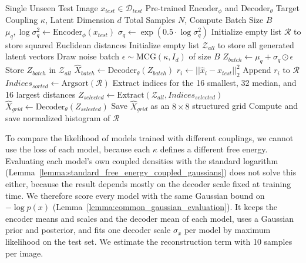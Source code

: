 \documentclass[twoside,11pt]{article}
\begin{document}
\begin{algorithm}[H]
\caption{CVAE Stochastic Consistency Analysis (Deep Tail Exploration)}
\label{alg:cvae_stochastic}
\begin{algorithmic}[1]
\Require Single Unseen Test Image $x_{test} \in \mathcal{D}_{test}$
\Require Pre-trained $\text{Encoder}_\phi$ and $\text{Decoder}_\theta$
\Require Target Coupling $\kappa$, Latent Dimension $d$
\Require Total Samples $N$, Compute Batch Size $B$
\Statex
\State {}
\State $\mu_q, \log\sigma_q^2 \leftarrow \text{Encoder}_\phi(x_{test})$
\State $\sigma_q \leftarrow \exp(0.5 \cdot \log\sigma_q^2)$
\Statex
\State Initialize empty list $\mathcal{R}$ to store squared Euclidean distances
\State Initialize empty list $\mathcal{Z}_{all}$ to store all generated latent vectors
\Statex
\State {}
    \State {}
    \State Draw noise batch $\epsilon \sim \text{MCG}(\kappa, I_d)$ of size $B$
    \State $Z_{batch} \leftarrow \mu_q + \sigma_q \odot \epsilon$
    \State Store $Z_{batch}$ in $\mathcal{Z}_{all}$
    \Statex
    \State {}
    \State $\hat{X}_{batch} \leftarrow \text{Decoder}_\theta(Z_{batch})$
    \Statex
    \State {}
        \State $r_i \leftarrow || \hat{x}_i - x_{test} ||_2^2$ 
        \State Append $r_i$ to $\mathcal{R}$
    \EndFor
\EndFor
\Statex
\State {}
\State $Indices_{sorted} \leftarrow \text{Argsort}(\mathcal{R})$
\State Extract indices for the 16 smallest, 32 median, and 16 largest distances
\Statex
\State {}
\State $Z_{selected} \leftarrow \text{Extract}(\mathcal{Z}_{all}, Indices_{selected})$
\State $\hat{X}_{grid} \leftarrow \text{Decoder}_\theta(Z_{selected})$
\State Save $\hat{X}_{grid}$ as an $8 \times 8$ structured grid
\State Compute and save normalized histogram of $\mathcal{R}$
\end{algorithmic}
\end{algorithm}

To compare the likelihood of models trained with different couplings, we cannot use the loss of each model, because each $\kappa$ defines a different free energy. Evaluating each model's own coupled densities with the standard logarithm (Lemma~\ref{lemma:standard_free_energy_coupled_gaussians}) does not solve this either, because the result depends mostly on the decoder scale fixed at training time. We therefore score every model with the same Gaussian bound on $-\log p(x)$ (Lemma~\ref{lemma:common_gaussian_evaluation}). It keeps the encoder means and scales and the decoder mean of each model, uses a Gaussian prior and posterior, and fits one decoder scale $\sigma_x$ per model by maximum likelihood on the test set. We estimate the reconstruction term with 10 samples per image.
\end{document}
